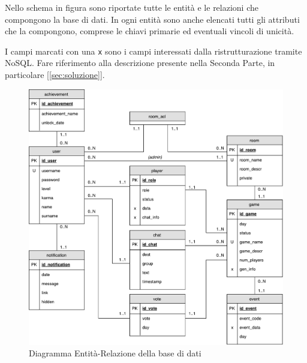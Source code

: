 Nello schema in figura sono riportate tutte le entità e le relazioni che compongono la base di dati. In ogni entità sono anche elencati tutti gli attributi che la compongono, comprese le chiavi primarie ed eventuali vincoli di unicità.

I campi marcati con una \texttt{x} sono i campi interessati dalla ristrutturazione tramite NoSQL. Fare riferimento alla descrizione presente nella Seconda Parte, in particolare [\ref{sec:soluzione}].

\begin{figure}[H]
	\centering
	\includegraphics[width=\textwidth]{ER.pdf}
	\caption{Diagramma Entità-Relazione della base di dati}
\end{figure}

